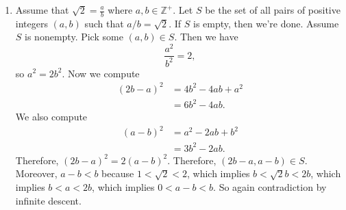 \documentclass[12pt]{article}
\begin{document}
\begin{enumerate}
    \item Assume that $\sqrt2=\frac{a}{b}$ where $a,b\in\mathbb Z^+$. Let $S$ be the set of all pairs of positive integers $(a,b)$ such that $a/b=\sqrt2$. If $S$ is empty, then we're done. Assume $S$ is nonempty. Pick some $(a,b)\in S$. Then we have
    \[\frac{a^2}{b^2}=2,\]
    so $a^2=2b^2$. Now we compute
    \begin{align*}
        (2b-a)^2 &= 4b^2-4ab+a^2\\
        &= 6b^2-4ab.
    \end{align*}
    We also compute
    \begin{align*}
        (a-b)^2 &= a^2-2ab+b^2\\
        &= 3b^2-2ab.
    \end{align*}
    Therefore, $(2b-a)^2=2(a-b)^2$. Therefore, $(2b-a,a-b)\in S$. Moreover, $a-b<b$ because $1<\sqrt2< 2$, which implies $b< \sqrt 2b< 2b$, which implies $b< a< 2b$, which implies $0< a-b< b$. So again contradiction by infinite descent.
\end{enumerate}
\end{document}
